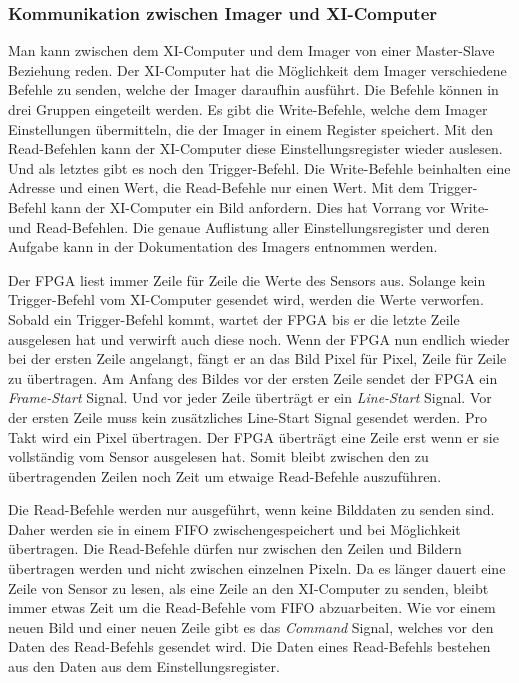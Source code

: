 \documentclass{article}
\begin{document}
\subsubsection*{Kommunikation zwischen Imager und XI-Computer}

Man kann zwischen dem XI-Computer und dem Imager von einer Master-Slave Beziehung reden. Der XI-Computer hat die Möglichkeit dem Imager verschiedene Befehle zu senden, welche der Imager daraufhin ausführt. Die Befehle können in drei Gruppen eingeteilt werden. Es gibt die Write-Befehle, welche dem Imager Einstellungen übermitteln, die der Imager in einem Register speichert. Mit den Read-Befehlen kann der XI-Computer diese Einstellungsregister wieder auslesen. Und als letztes gibt es noch den Trigger-Befehl. Die Write-Befehle beinhalten eine Adresse und einen Wert, die Read-Befehle nur einen Wert. Mit dem Trigger-Befehl kann der XI-Computer ein Bild anfordern. Dies hat Vorrang vor Write- und Read-Befehlen. Die genaue Auflistung aller Einstellungsregister und deren Aufgabe kann in der Dokumentation des Imagers entnommen werden. 

Der FPGA liest immer Zeile für Zeile die Werte des Sensors aus. Solange kein Trigger-Befehl vom XI-Computer gesendet wird, werden die Werte verworfen. Sobald ein Trigger-Befehl kommt, wartet der FPGA bis er die letzte Zeile ausgelesen hat und verwirft auch diese noch. Wenn der FPGA nun endlich wieder bei der ersten Zeile angelangt, fängt er an das Bild Pixel für Pixel, Zeile für Zeile zu übertragen. Am Anfang des Bildes vor der ersten Zeile sendet der FPGA ein \textit{Frame-Start} Signal. Und vor jeder Zeile überträgt er ein \textit{Line-Start} Signal. Vor der ersten Zeile muss kein zusätzliches Line-Start Signal gesendet werden. Pro Takt wird ein Pixel übertragen. Der FPGA überträgt eine Zeile erst wenn er sie vollständig vom Sensor ausgelesen hat. Somit bleibt zwischen den zu übertragenden Zeilen noch Zeit um etwaige Read-Befehle auszuführen.

Die Read-Befehle werden nur ausgeführt, wenn keine Bilddaten zu senden sind. Daher werden sie in einem FIFO zwischengespeichert und bei Möglichkeit übertragen. Die Read-Befehle dürfen nur zwischen den Zeilen und Bildern übertragen werden und nicht zwischen einzelnen Pixeln. Da es länger dauert eine Zeile von Sensor zu lesen, als eine Zeile an den XI-Computer zu senden, bleibt immer etwas Zeit um die Read-Befehle vom FIFO abzuarbeiten. Wie vor einem neuen Bild und einer neuen Zeile gibt es das \textit{Command} Signal, welches vor den Daten des Read-Befehls gesendet wird. Die Daten eines Read-Befehls bestehen aus den Daten aus dem Einstellungsregister.
\end{document}

